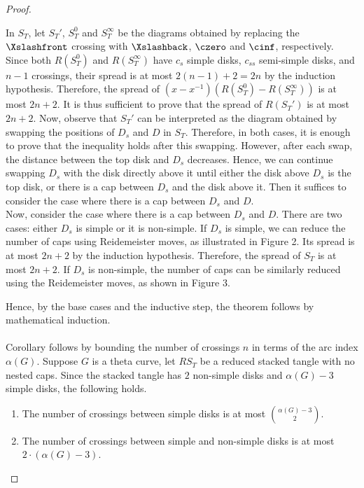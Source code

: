 \documentclass{article}
\theoremstyle{definition}
\theoremstyle{theorem}
\theoremstyle{proposition}
\theoremstyle{corollary}
\begin{document}
\begin{proof}
\begin{enumerate}
        In $S_T$, let $S_T'$, $S_T^0$ and $S_T^\infty$ be the diagrams obtained by replacing the $\Xslashfront$ crossing with $\Xslashback$, $\czero$ and $\cinf$, respectively. Since both $R \left( S_T^0 \right)$ and $R \left( S_T^\infty \right)$ have $c_s$ simple disks, $c_{ss}$ semi-simple disks, and $n-1$ crossings, their spread is at most $2(n-1)+2=2n$ by the induction hypothesis. Therefore, the spread of $(x - x^{-1}) \left( R \left( S_T^0 \right) - R \left( S_T^\infty \right) \right)$ is at most $2n+2$. It is thus sufficient to prove that the spread of $R \left( S_T' \right)$ is at most $2n+2$. Now, observe that $S_T'$ can be interpreted as the diagram obtained by swapping the positions of $D_s$ and $D$ in $S_T$. Therefore, in both cases, it is enough to prove that the inequality holds after this swapping. However, after each swap, the distance between the top disk and $D_s$ decreases. Hence, we can continue swapping $D_s$ with the disk directly above it until either the disk above $D_s$ is the top disk, or there is a cap between $D_s$ and the disk above it. Then it suffices to consider the case where there is a cap between $D_s$ and $D$. \\
        Now, consider the case where there is a cap between $D_s$ and $D$. There are two cases: either $D_s$ is simple or it is non-simple. If $D_s$ is simple, we can reduce the number of caps using Reidemeister moves, as illustrated in Figure 2. Its spread is at most $2n+2$ by the induction hypothesis. Therefore, the spread of $S_T$ is at most $2n+2$. If $D_s$ is non-simple, the number of caps can be similarly reduced using the Reidemeister moves, as shown in Figure 3. \\
    \end{enumerate}
    Hence, by the base cases and the inductive step, the theorem follows by mathematical induction. \\ \\
    Corollary follows by bounding the number of crossings $n$ in terms of the arc index $\alpha(G)$. Suppose $G$ is a theta curve, let $RS_T$ be a reduced stacked tangle with no nested caps. Since the stacked tangle has $2$ non-simple disks and $\alpha(G)-3$ simple disks, the following holds.
    \begin{enumerate}
        \item The number of crossings between simple disks is at most $\binom{\alpha(G)-3}{2}$.
        \item The number of crossings between simple and non-simple disks is at most $2 \cdot (\alpha(G)-3)$.

\end{enumerate}
\end{proof}
\end{document}
